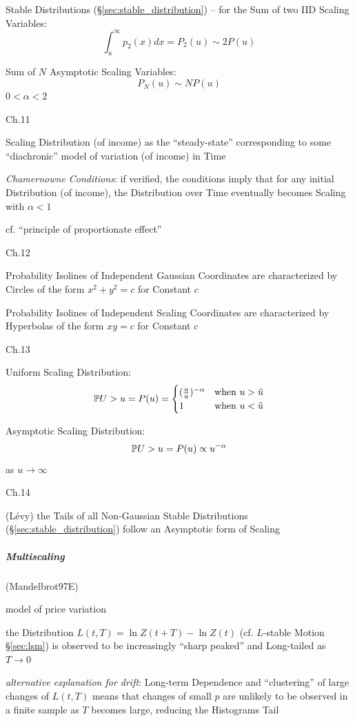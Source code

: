 Stable Distributions (\S\ref{sec:stable_distribution}) -- for the Sum of two
IID Scaling Variables:
\[
  \int_u^\infty p_2(x) dx = P_2(u) \sim 2 P(u)
\]

Sum of $N$ Asymptotic Scaling Variables:
\[
  P_N(u) \sim N P(u)
\]
$0 < \alpha < 2$

Ch.11

Scaling Distribution (of income) as the ``steady-state'' corresponding to some
``diachronic'' model of variation (of income) in Time

\emph{Chamernowne Conditions}: if verified, the conditions imply that for any
initial Distribution (of income), the Distribution over Time eventually becomes
Scaling with $\alpha < 1$

cf. ``principle of proportionate effect''

Ch.12

Probability Isolines of Independent Gaussian Coordinates are characterized by
Circles of the form $x^2 + y^2 = c$ for Constant $c$

Probability Isolines of Independent Scaling Coordinates are characterized by
Hyperbolas of the form $x y = c$ for Constant $c$

Ch.13

Uniform Scaling Distribution:
\[
  \mathbb{P}{U > u} = P(u) = \begin{cases}
    (\frac{u}{\tilde{u}})^{-\alpha} & \text{when } u > \tilde{u} \\
    1                               & \text{when } u < \tilde{u} \\
  \end{cases}
\]

Asymptotic Scaling Distribution:
\[
  \mathbb{P}{U > u} = P(u) \propto u^{-\alpha}
\]
as $u \to \infty$

Ch.14

(L\'evy) the Tails of all Non-Gaussian Stable Distributions
(\S\ref{sec:stable_distribution}) follow an Asymptotic form of Scaling



\subparagraph{Multiscaling}\label{sec:multiscaling}\hfill

(Mandelbrot97E)

model of price variation

the Distribution $L(t, T) = \ln Z(t + T) - \ln Z(t)$ (cf. $L$-stable Motion
\S\ref{sec:lsm}) is observed to be increasingly ``sharp peaked'' and Long-tailed
as $T \to 0$

\emph{alternative explanation for drift}: Long-term Dependence and
``clustering'' of large changes of $L(t, T)$ means that changes of small $p$ are
unlikely to be observed in a finite sample as $T$ becomes large, reducing the
Histograms Tail

